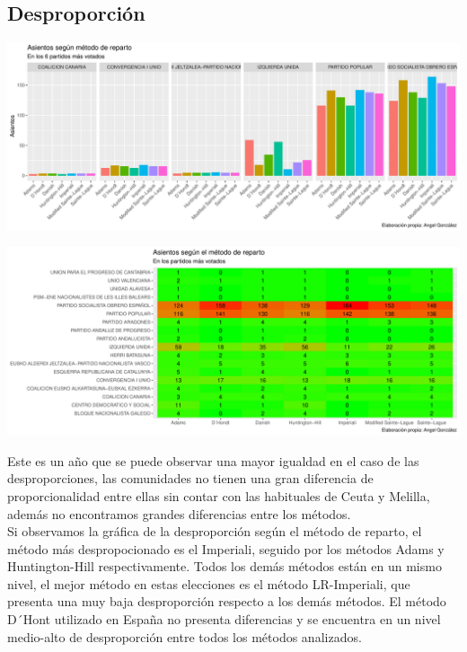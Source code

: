 \documentclass[12pt,a4paper,]{book}
\numberwithin{dummy}{section}
\theoremstyle{ocrenumbox}
\theoremstyle{blacknumex}
\theoremstyle{blacknumbox}
\theoremstyle{ocrenum}
\theoremstyle{ocrenum}
\begin{document}
\hypertarget{desproporciuxf3n-9}{%
\subsection{Desproporción}\label{desproporciuxf3n-9}}

\begin{center}\includegraphics[width=1\linewidth]{figurasR/unnamed-chunk-104-1} \end{center}

\begin{center}\includegraphics[width=1\linewidth]{figurasR/unnamed-chunk-104-2} \end{center}

Este es un año que se puede observar una mayor igualdad en el caso de
las desproporciones, las comunidades no tienen una gran diferencia de
proporcionalidad entre ellas sin contar con las habituales de Ceuta y
Melilla, además no encontramos grandes diferencias entre los métodos.\\
Si observamos la gráfica de la desproporción según el método de reparto,
el método más despropocionado es el Imperiali, seguido por los métodos
Adams y Huntington-Hill respectivamente. Todos los demás métodos están
en un mismo nivel, el mejor método en estas elecciones es el método
LR-Imperiali, que presenta una muy baja desproporción respecto a los
demás métodos. El método D´Hont utilizado en España no presenta
diferencias y se encuentra en un nivel medio-alto de desproporción entre
todos los métodos analizados.
\end{document}
